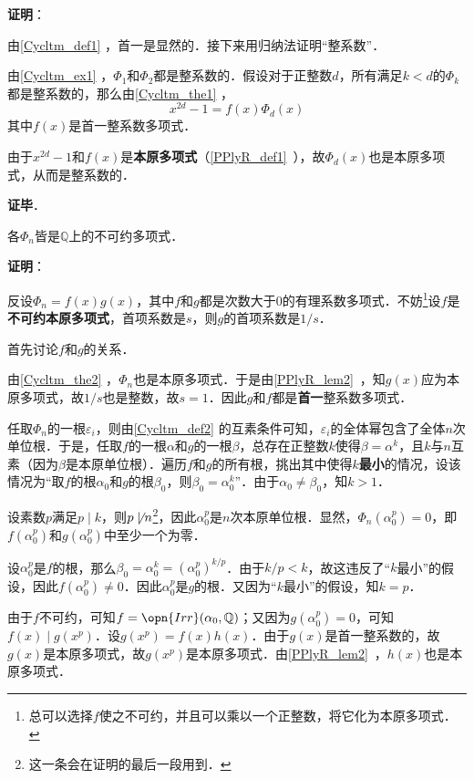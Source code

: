 \textbf{证明}：

由\autoref{Cycltm_def1} ，首一是显然的．接下来用归纳法证明“整系数”．

由\autoref{Cycltm_ex1} ，$\Phi_1$和$\Phi_2$都是整系数的．假设对于正整数$d$，所有满足$k<d$的$\Phi_k$都是整系数的，那么由\autoref{Cycltm_the1} ，
\begin{equation}
x^{2d}-1 = f(x)\Phi_d(x)
\end{equation}
其中$f(x)$是首一整系数多项式．

由于$x^{2d}-1$和$f(x)$是\textbf{本原多项式}（\autoref{PPlyR_def1}~），故$\Phi_d(x)$也是本原多项式，从而是整系数的．

\textbf{证毕}．




\begin{theorem}{}
各$\Phi_n$皆是$\mathbb{Q}$上的不可约多项式．
\end{theorem}

\textbf{证明}：

反设$\Phi_n=f(x)g(x)$，其中$f$和$g$都是次数大于$0$的有理系数多项式．不妨\footnote{总可以选择$f$使之不可约，并且可以乘以一个正整数，将它化为本原多项式．}设$f$是\textbf{不可约本原多项式}，首项系数是$s$，则$g$的首项系数是$1/s$．

首先讨论$f$和$g$的关系．

由\autoref{Cycltm_the2} ，$\Phi_n$也是本原多项式．于是由\autoref{PPlyR_lem2}~，知$g(x)$应为本原多项式，故$1/s$也是整数，故$s=1$．因此$g$和$f$都是\textbf{首一}整系数多项式．

任取$\Phi_n$的一根$\varepsilon_i$，则由\autoref{Cycltm_def2} 的互素条件可知，$\varepsilon_i$的全体幂包含了全体$n$次单位根．于是，任取$f$的一根$\alpha$和$g$的一根$\beta$，总存在正整数$k$使得$\beta=\alpha^k$，且$k$与$n$互素（因为$\beta$是本原单位根）．遍历$f$和$g$的所有根，挑出其中使得$k$\textbf{最小}的情况，设该情况为“取$f$的根$\alpha_0$和$g$的根$\beta_0$，则$\beta_0=\alpha_0^k$”．由于$\alpha_0\neq \beta_0$，知$k>1$．

设素数$p$满足$p\mid k$，则$p\not\mid n$\footnote{这一条会在证明的最后一段用到．}，因此$\alpha_0^p$是$n$次本原单位根．显然，$\Phi_n(\alpha_0^p)=0$，即$f(\alpha_0^p)$和$g(\alpha_0^p)$中至少一个为零．

设$\alpha_0^p$是$f$的根，那么$\beta_0=\alpha_0^k=(\alpha_0^p)^{k/p}$．由于$k/p<k$，故这违反了“$k$最小”的假设，因此$f(\alpha_0^p)\neq 0$．因此$\alpha_0^p$是$g$的根．又因为“$k$最小”的假设，知$k=p$．

由于$f$不可约，可知$f=\opn{Irr}(\alpha_0, \mathbb{Q})$；又因为$g(\alpha_0^p)=0$，可知$f(x)\mid g(x^p)$．设$g(x^p)=f(x)h(x)$．由于$g(x)$是首一整系数的，故$g(x)$是本原多项式，故$g(x^p)$是本原多项式．由\autoref{PPlyR_lem2}~，$h(x)$也是本原多项式．

